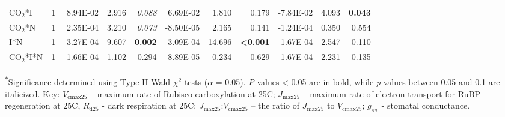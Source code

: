 \begin{landscape}
\begin{table}
{\begin{tabular}{p{3cm}p{0.5cm}p{1.75cm}p{1.5cm}p{1.5cm}p{1.75cm}p{1.5cm}p{1.5cm}p{1.75cm}p{1.5cm}p{1.5cm}}
            CO$_2$*I & \multicolumn{1}{r}{1}
            & \multicolumn{1}{r}{ 8.94E-02}     & \multicolumn{1}{r}{2.916}         & \multicolumn{1}{r}{\textit{0.088}}
            & \multicolumn{1}{r}{ 6.69E-02}     & \multicolumn{1}{r}{1.810}         & \multicolumn{1}{r}{0.179}
            & \multicolumn{1}{r}{-7.84E-02}     & \multicolumn{1}{r}{4.093}         & \multicolumn{1}{r}{\textbf{0.043}} 
            \\

            CO$_2$*N & \multicolumn{1}{r}{1}
            & \multicolumn{1}{r}{ 2.35E-04}     & \multicolumn{1}{r}{3.210}         & \multicolumn{1}{r}{\textit{0.073}}
            & \multicolumn{1}{r}{-8.50E-05}     & \multicolumn{1}{r}{2.165}         & \multicolumn{1}{r}{0.141}
            & \multicolumn{1}{r}{-1.24E-04}     & \multicolumn{1}{r}{0.350}         & \multicolumn{1}{r}{0.554} 
            \\

            I*N & \multicolumn{1}{r}{1}
            & \multicolumn{1}{r}{ 3.27E-04}     & \multicolumn{1}{r}{9.607}         & \multicolumn{1}{r}{\textbf{0.002}}
            & \multicolumn{1}{r}{-3.09E-04}     & \multicolumn{1}{r}{14.696}        & \multicolumn{1}{r}{\textbf{<0.001}}
            & \multicolumn{1}{r}{-1.67E-04}     & \multicolumn{1}{r}{2.547}         & \multicolumn{1}{r}{0.110} 
            \\

            CO$_2$*I*N & \multicolumn{1}{r}{1}
            & \multicolumn{1}{r}{-1.66E-04}     & \multicolumn{1}{r}{1.102}         & \multicolumn{1}{r}{0.294}
            & \multicolumn{1}{r}{-8.89E-05}     & \multicolumn{1}{r}{0.234}         & \multicolumn{1}{r}{0.629}
            & \multicolumn{1}{r}{ 1.67E-04}     & \multicolumn{1}{r}{2.231}         & \multicolumn{1}{r}{0.135} 
            \\
            \hline
    \end{tabular}}
    \label{tab:table5.2}
    \end{table}
\begin{singlespace}
\noindent \textsuperscript{$*$}Significance determined using Type II Wald $\chi^{2}$ tests ($\alpha$ = 0.05). \textit{P}-values < 0.05 are in bold, while \textit{p}-values between 0.05 and 0.1 are italicized. Key: $V_\mathrm{cmax25}$ – maximum rate of Rubisco carboxylation at 25\textdegree{}C; $J_\mathrm{max25}$ – maximum rate of electron transport for RuBP regeneration at 25\textdegree{}C, $R_\mathrm{d25}$ - dark respiration at 25\textdegree{}C; $J_{\mathrm{max25}}$:$V_\mathrm{cmax25}$ – the ratio of $J_\mathrm{max25}$ to $V_\mathrm{cmax25}$; $g_{sw}$ - stomatal conductance.
\end{singlespace}
\end{landscape}
\clearpage

